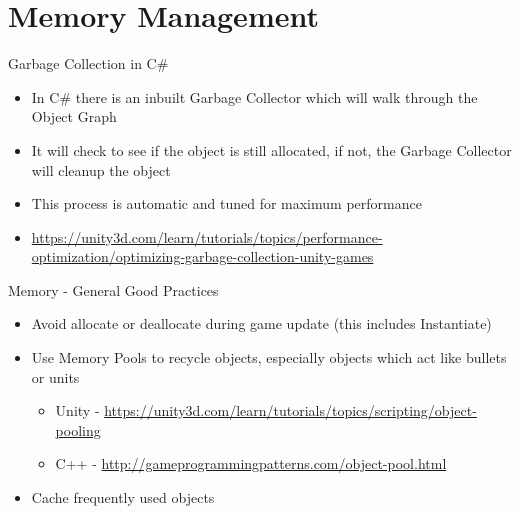 \part{Memory Management}
\frame{\partpage}

\begin{frame}{Garbage Collection in C\#}
	\begin{itemize}
		\pause \item In C\# there is an inbuilt Garbage Collector which will  walk through the Object Graph
		\pause \item It will check to see if the object is still allocated, if not, the Garbage Collector will cleanup the object
		\pause \item This process is automatic and  tuned for maximum performance
		\pause \item \url{https://unity3d.com/learn/tutorials/topics/performance-optimization/optimizing-garbage-collection-unity-games}
	\end{itemize}
\end{frame}


\begin{frame}{Memory - General Good Practices}
	\begin{itemize}
		\pause \item Avoid allocate or deallocate during game update (this includes Instantiate)
		\pause \item Use Memory Pools to recycle objects, especially objects which act like bullets or units
		\begin{itemize}
			\pause \item Unity - \url{https://unity3d.com/learn/tutorials/topics/scripting/object-pooling}
			\pause \item C++ - \url{http://gameprogrammingpatterns.com/object-pool.html} 
		\end{itemize}  
		\pause \item Cache frequently used objects
	\end{itemize}
\end{frame}
